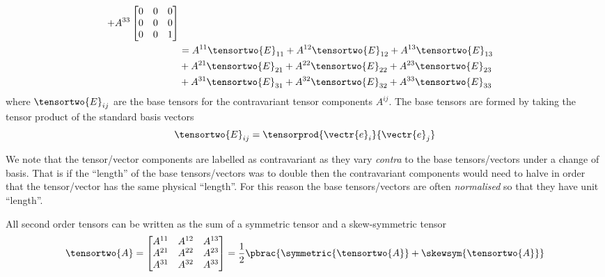 \begin{equation}
\begin{aligned}
    +A^{33}\begin{bmatrix} 0 & 0 & 0 \\ 0 & 0 & 0 \\ 0 & 0 & 1 \end{bmatrix} \\
    &=A^{11}\tensortwo{E}_{11}+A^{12}\tensortwo{E}_{12}+A^{13}\tensortwo{E}_{13} \\
    &+A^{21}\tensortwo{E}_{21}+A^{22}\tensortwo{E}_{22}+A^{23}\tensortwo{E}_{23} \\
    &+A^{31}\tensortwo{E}_{31}+A^{32}\tensortwo{E}_{32}+A^{33}\tensortwo{E}_{33}
  \end{aligned}
  \label{eqn:VoigtNotationSecondOrderTensorStdBasis}
\end{equation}
where $\tensortwo{E}_{ij}$ are the base tensors for the contravariant
tensor components $A^{ij}$. The base tensors are formed by taking the
tensor product of the standard basis vectors \ie
\begin{equation}
  \tensortwo{E}_{ij}=\tensorprod{\vectr{e}_{i}}{\vectr{e}_{j}}
\end{equation}


We note that the tensor/vector components are labelled as
contravariant as they vary \emph{contra} to the base tensors/vectors
under a change of basis. That is if the ``length'' of the base
tensors/vectors was to double then the contravariant components would
need to halve in order that the tensor/vector has the same physical
``length''. For this reason the base tensors/vectors are often
\emph{normalised} so that they have unit ``length''.

All second order tensors can be written as the sum of a symmetric
tensor and a skew-symmetric tensor \ie
\begin{equation}
  \tensortwo{A}=\begin{bmatrix}
  A^{11} & A^{12} & A^{13} \\
  A^{21} & A^{22} & A^{23} \\
  A^{31} & A^{32} & A^{33}
  \end{bmatrix}=\dfrac{1}{2}\pbrac{\symmetric{\tensortwo{A}}+\skewsym{\tensortwo{A}}}
\end{equation}

